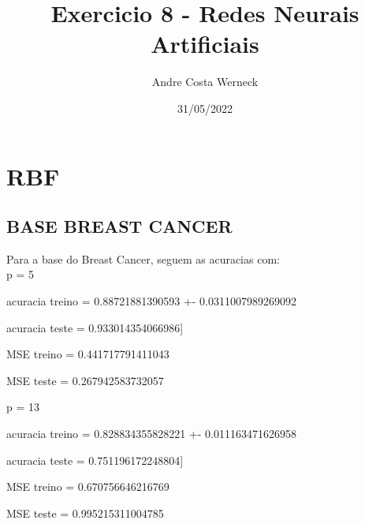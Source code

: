 \documentclass{article}
\begin{document}


\title{Exercicio 8 - Redes Neurais Artificiais}
\author{Andre Costa Werneck}
\date{31/05/2022}
\maketitle
\newpage





\section{RBF}
\subsection{BASE BREAST CANCER}

Para a base do Breast Cancer, seguem as acuracias com:
\\p = 5 

\begin{Schunk}
\begin{Soutput}
acuracia treino = 0.88721881390593 +- 0.0311007989269092
\end{Soutput}
\begin{Soutput}
acuracia teste = 0.933014354066986]
\end{Soutput}
\begin{Soutput}
MSE treino = 0.441717791411043
\end{Soutput}
\begin{Soutput}
MSE teste = 0.267942583732057
\end{Soutput}
\end{Schunk}

p = 13


\begin{Schunk}
\begin{Soutput}
acuracia treino = 0.828834355828221 +- 0.011163471626958
\end{Soutput}
\begin{Soutput}
acuracia teste = 0.751196172248804]
\end{Soutput}
\begin{Soutput}
MSE treino = 0.670756646216769
\end{Soutput}
\begin{Soutput}
MSE teste = 0.995215311004785
\end{Soutput}
\end{Schunk}
\end{document}
